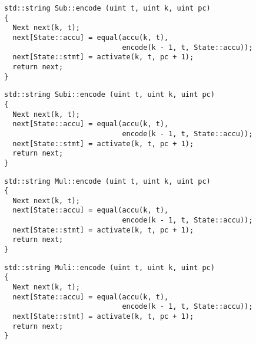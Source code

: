 \begin{lstlisting}[style=c++, style=encode]
std::string Sub::encode (uint t, uint k, uint pc)
{
  Next next(k, t);
  next[State::accu] = equal(accu(k, t),
                            encode(k - 1, t, State::accu));
  next[State::stmt] = activate(k, t, pc + 1);
  return next;
}
\end{lstlisting}


\begin{lstlisting}[style=c++, style=encode]
std::string Subi::encode (uint t, uint k, uint pc)
{
  Next next(k, t);
  next[State::accu] = equal(accu(k, t),
                            encode(k - 1, t, State::accu));
  next[State::stmt] = activate(k, t, pc + 1);
  return next;
}
\end{lstlisting}


\begin{lstlisting}[style=c++, style=encode]
std::string Mul::encode (uint t, uint k, uint pc)
{
  Next next(k, t);
  next[State::accu] = equal(accu(k, t),
                            encode(k - 1, t, State::accu));
  next[State::stmt] = activate(k, t, pc + 1);
  return next;
}
\end{lstlisting}


\newpage

\begin{lstlisting}[style=c++, style=encode]
std::string Muli::encode (uint t, uint k, uint pc)
{
  Next next(k, t);
  next[State::accu] = equal(accu(k, t),
                            encode(k - 1, t, State::accu));
  next[State::stmt] = activate(k, t, pc + 1);
  return next;
}
\end{lstlisting}

